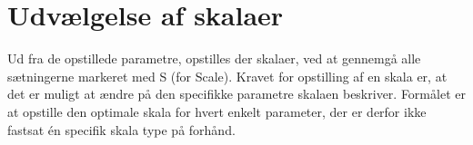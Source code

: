 \section{Udvælgelse af skalaer}
\label{ParametreDatabehandlingSkalaer}
%


Ud fra de opstillede parametre, opstilles der skalaer, ved at gennemgå alle sætningerne markeret med S (for Scale). Kravet for opstilling af en skala er, at det er muligt at ændre på den specifikke parametre skalaen beskriver. Formålet er at opstille den optimale skala for hvert enkelt parameter, der er derfor ikke fastsat én specifik skala type på forhånd. 








